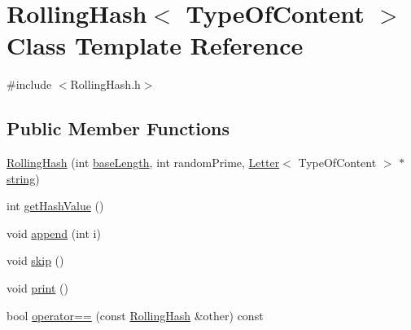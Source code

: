 \hypertarget{classRollingHash}{\section{Rolling\+Hash$<$ Type\+Of\+Content $>$ Class Template Reference}
\label{classRollingHash}
}


{\ttfamily \#include $<$Rolling\+Hash.\+h$>$}

\subsection*{Public Member Functions}
\begin{DoxyCompactItemize}
\item 
\hyperlink{classRollingHash_a23a92a45f616ddec85966845b5facb2e}{Rolling\+Hash} (int \hyperlink{classRollingHash_aea18bfbf983b35d528fa634d5f08c810}{base\+Length}, int random\+Prime, \hyperlink{classLetter}{Letter}$<$ Type\+Of\+Content $>$ $\ast$\hyperlink{Main_8cpp_a4505c08c065b48840a30eedd9845cce2}{string})
\item 
int \hyperlink{classRollingHash_a234a787077388a3825a9218702ce8647}{get\+Hash\+Value} ()
\item 
void \hyperlink{classRollingHash_a26ee45299e367c88ab8c80801dd007fc}{append} (int i)
\item 
void \hyperlink{classRollingHash_aa4f2a75c882a87d7cce490663c8e01be}{skip} ()
\item 
void \hyperlink{classRollingHash_a3a1b45d3adddedb05d92e89d5fd0f5ae}{print} ()
\item 
bool \hyperlink{classRollingHash_a2d7db74aad6ab8e34e1829c3ddf79989}{operator==} (const \hyperlink{classRollingHash}{Rolling\+Hash} \&other) const 
\end{DoxyCompactItemize}
